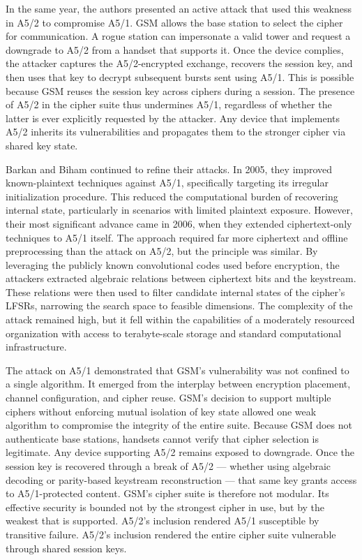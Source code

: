 In the same year, the authors presented an active attack that used this weakness in A5/2 to compromise A5/1. GSM allows the base station to select the cipher for communication. A rogue station can impersonate a valid tower and request a downgrade to A5/2 from a handset that supports it. Once the device complies, the attacker captures the A5/2-encrypted exchange, recovers the session key, and then uses that key to decrypt subsequent bursts sent using A5/1. This is possible because GSM reuses the session key across ciphers during a session. The presence of A5/2 in the cipher suite thus undermines A5/1, regardless of whether the latter is ever explicitly requested by the attacker. Any device that implements A5/2 inherits its vulnerabilities and propagates them to the stronger cipher via shared key state.

Barkan and Biham continued to refine their attacks. In 2005, they improved known-plaintext techniques against A5/1, specifically targeting its irregular initialization procedure. This reduced the computational burden of recovering internal state, particularly in scenarios with limited plaintext exposure. However, their most significant advance came in 2006, when they extended ciphertext-only techniques to A5/1 itself. The approach required far more ciphertext and offline preprocessing than the attack on A5/2, but the principle was similar. By leveraging the publicly known convolutional codes used before encryption, the attackers extracted algebraic relations between ciphertext bits and the keystream. These relations were then used to filter candidate internal states of the cipher’s LFSRs, narrowing the search space to feasible dimensions. The complexity of the attack remained high, but it fell within the capabilities of a moderately resourced organization with access to terabyte-scale storage and standard computational infrastructure.

The attack on A5/1 demonstrated that GSM’s vulnerability was not confined to a single algorithm. It emerged from the interplay between encryption placement, channel configuration, and cipher reuse. GSM’s decision to support multiple ciphers without enforcing mutual isolation of key state allowed one weak algorithm to compromise the integrity of the entire suite. Because GSM does not authenticate base stations, handsets cannot verify that cipher selection is legitimate. Any device supporting A5/2 remains exposed to downgrade. Once the session key is recovered through a break of A5/2 — whether using algebraic decoding or parity-based keystream reconstruction — that same key grants access to A5/1-protected content. GSM’s cipher suite is therefore not modular. Its effective security is bounded not by the strongest cipher in use, but by the weakest that is supported. A5/2’s inclusion rendered A5/1 susceptible by transitive failure. A5/2's inclusion rendered the entire cipher suite vulnerable through shared session keys.


